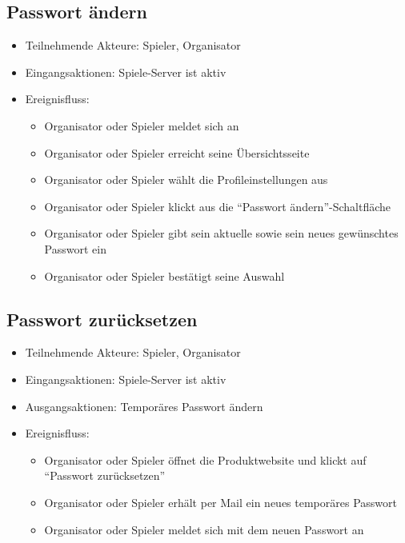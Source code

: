 \documentclass[a4paper]{scrreprt}
\begin{document}
    \subsection{Passwort ändern}
    \begin{itemize}
    \item Teilnehmende Akteure: \Gls{Spieler}, \Gls{Organisator}
    \item Eingangsaktionen: Spiele-Server ist aktiv
    \item Ereignisfluss:
        \begin{itemize}
            \item Organisator oder Spieler meldet sich an
            \item Organisator oder Spieler erreicht seine Übersichtsseite
            \item Organisator oder Spieler wählt die Profileinstellungen aus
            \item Organisator oder Spieler klickt aus die \enquote{Passwort ändern}-Schaltfläche
            \item Organisator oder Spieler gibt sein aktuelle sowie sein neues gewünschtes Passwort ein
            \item Organisator oder Spieler bestätigt seine Auswahl
        \end{itemize}
    \end{itemize}

    \subsection{Passwort zurücksetzen}
    \begin{itemize}
        \item Teilnehmende Akteure: \Gls{Spieler}, \Gls{Organisator}
        \item Eingangsaktionen: Spiele-Server ist aktiv
        \item Ausgangsaktionen: Temporäres Passwort ändern
        \item Ereignisfluss:
        \begin{itemize}
            \item Organisator oder Spieler öffnet die Produktwebsite und klickt auf \enquote{Passwort zurücksetzen}
            \item Organisator oder Spieler erhält per Mail ein neues temporäres Passwort
            \item Organisator oder Spieler meldet sich mit dem neuen Passwort an
        \end{itemize}
    \end{itemize}
\end{document}
